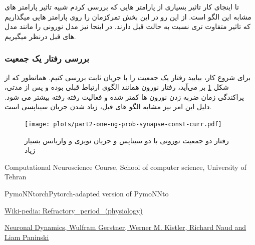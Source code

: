 \documentclass{report}
\begin{document}
        تا اینجای کار تاثیر بسیاری از پارامتر هایی که بررسی کردم شبیه تاثیر پارامتر های مشابه این الگو است. از این رو در این بخش تمرکزمان را روی پارامتر هایی میگذاریم که تاثیر متفاوت تری نسبت به حالت قبل دارند. در اینجا نیز مدل نورونی را مانند مدل های قبل درنظر میگیریم.
        \subsubsection*{بررسی رفتار یک جمعیت}
            برای شروع کار، بیایید رفتار یک جمعیت را با جریان ثابت بررسی کنیم. همانطور که از شکل 
            \ref{fig:part2-one-ng-prob-synapse-const-curr}
            بر می‌آید، رفتار نورون همانند الگوی ارتباط قبلی بوده و پس از مدتی، پراکندگی زمان ضربه زدن نورون ها کمتر شده و فعالیت رفته رفته بیشتر می شود. دلیل این امر نیز مشابه الگو های قبل، زیاد شدن جریان سیناپسی است.
            \begin{figure}[!ht]
                \centering
                \texttt{[image: plots/part2-one-ng-prob-synapse-const-curr.pdf]} 
                \caption{رفتار دو جمعیت نورونی با دو سیناپس و جریان نویزی و واریانس بسیار زیاد}
                \label{fig:part2-one-ng-prob-synapse-const-curr}
            \end{figure}
\newpage
\begin{thebibliography}{1}
        \begin{latin}
            Computational Neuroscience Course, School of computer science, University of Tehran
        \end{latin}
        \begin{latin}
            PymoNNtorchPytorch-adapted version of PymoNNto
        \end{latin}
        \begin{latin}
            \href{https://en.wikipedia.org/wiki/Refractory_period_(physiology)}{Wiki-pedia: Refractory\_period\_(physiology)}
        \end{latin}
        \begin{latin}
            \href{https://neuronaldynamics.epfl.ch/online/Ch12.S3.html}{Neuronal Dynamics, Wulfram Gerstner, Werner M. Kistler, Richard Naud and Liam Paninski
            }
        \end{latin}
    \end{thebibliography}
\end{document}
